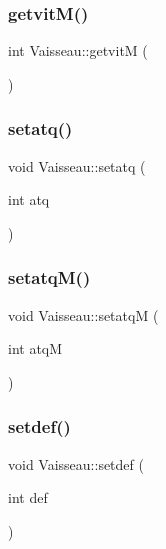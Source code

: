 \subsubsection{\texorpdfstring{getvit\+M()}{getvitM()}}
{\footnotesize\ttfamily int Vaisseau\+::getvitM (\begin{DoxyParamCaption}{ }\end{DoxyParamCaption})}

\mbox{\label{class_vaisseau_a5dac2a3814de298d8d515c20b7463397}} 
\subsubsection{\texorpdfstring{setatq()}{setatq()}}
{\footnotesize\ttfamily void Vaisseau\+::setatq (\begin{DoxyParamCaption}\item[{int}]{atq }\end{DoxyParamCaption})}

\mbox{\label{class_vaisseau_ac1eaf0b717e81471f259ce94ad0afb20}} 
\subsubsection{\texorpdfstring{setatq\+M()}{setatqM()}}
{\footnotesize\ttfamily void Vaisseau\+::setatqM (\begin{DoxyParamCaption}\item[{int}]{atqM }\end{DoxyParamCaption})}

\mbox{\label{class_vaisseau_aa6a93a1d1bfd8f7bac3e079fff6d84fa}} 
\subsubsection{\texorpdfstring{setdef()}{setdef()}}
{\footnotesize\ttfamily void Vaisseau\+::setdef (\begin{DoxyParamCaption}\item[{int}]{def }\end{DoxyParamCaption})}

\mbox{\label{class_vaisseau_a4120a8c40229b8af08590ee3a6d00f6a}} 
